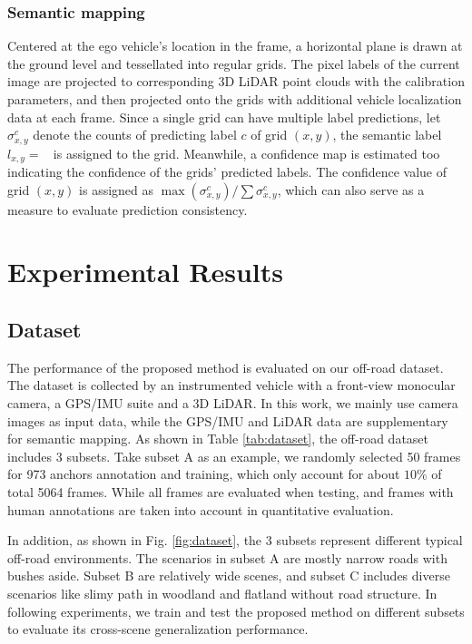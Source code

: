 \documentclass[letterpaper, 10 pt, conference]{ieeeconf}  %
\begin{document}
\subsubsection{Semantic mapping} \label{3_SM}

Centered at the ego vehicle's location in the frame, a horizontal plane is drawn at the ground level and tessellated into regular grids. The pixel labels of the current image are projected to corresponding 3D LiDAR point clouds with the calibration parameters, and then projected onto the grids with additional vehicle localization data at each frame. Since a single grid can have multiple label predictions, let $\sigma_{x,y}^c$ denote the counts of predicting label $c$ of grid $(x,y)$, the semantic label $l_{x,y}=\mathop{\text{argmax}_{c} (\sigma_{x,y}^c)}$ is assigned to the grid. Meanwhile, a confidence map is estimated too indicating the confidence of the grids' predicted labels. The confidence value of grid $(x,y)$ is assigned as $\max(\sigma_{x,y}^c)/\sum{\sigma_{x,y}^c}$, which can also serve as a measure to evaluate prediction consistency.

\section{Experimental Results}	\label{exp}
\subsection{Dataset}
The performance of the proposed method is evaluated on our off-road dataset. The dataset is collected by an instrumented vehicle with a front-view monocular camera, a GPS/IMU suite and a 3D LiDAR. In this work, we mainly use camera images as input data, while the GPS/IMU and LiDAR data are supplementary for semantic mapping.
As shown in Table \ref{tab:dataset}, the off-road dataset includes 3 subsets. Take subset A as an example, we randomly selected 50 frames for 973 anchors annotation and training, which only account for about $10\%$ of total 5064 frames. While all frames are evaluated when testing, and frames with human annotations are taken into account in quantitative evaluation.

In addition, as shown in Fig. \ref{fig:dataset}, the 3 subsets represent different typical off-road environments. The scenarios in subset A are mostly narrow roads with bushes aside. Subset B are relatively wide scenes, and subset C includes diverse scenarios like slimy path in woodland and flatland without road structure. In following experiments, we train and test the proposed method on different subsets to evaluate its cross-scene generalization performance.
\end{document}
